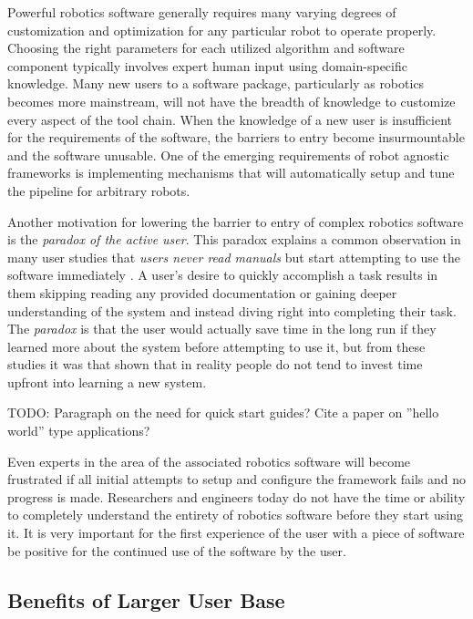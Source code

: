 \documentclass[10pt,journal,compsoc]{joser1}
\begin{document}
{Powerful robotics software generally requires many varying degrees of customization and optimization for any particular robot to operate properly. Choosing the right parameters for each utilized algorithm and software component typically involves expert human input using domain-specific knowledge. Many new users to a software package, particularly as robotics becomes more mainstream, will not have the breadth of knowledge to customize every aspect of the tool chain. When the knowledge of a new user is insufficient for the requirements of the software, the barriers to entry become insurmountable and the software unusable. One of the emerging requirements of robot agnostic frameworks is implementing mechanisms that will automatically setup and tune the pipeline for arbitrary robots.

Another motivation for lowering the barrier to entry of complex robotics software is the \textit{paradox of the active user}. This paradox explains a common observation in many user studies that \textit{users never read manuals} but start attempting to use the software immediately \cite{carroll1987interfacing}. A user's desire to quickly accomplish a task results in them skipping reading any provided documentation or gaining deeper understanding of the system and instead diving right into completing their task. The \textit{paradox} is that the user would actually save time in the long run if they learned more about the system before attempting to use it, but from these studies it was that shown that in reality people do not tend to invest time upfront into learning a new system.

TODO: Paragraph on the need for quick start guides? Cite a paper on ''hello world'' type applications?

Even experts in the area of the associated robotics software will become frustrated if all initial attempts to setup and configure the framework fails and no progress is made. Researchers and engineers today do not have the time or ability to completely understand the entirety of robotics software before they start using it. It is very important for the first experience of the user with a piece of software be positive for the continued use of the software by the user.

\subsection{Benefits of Larger User Base}

}
\end{document}
